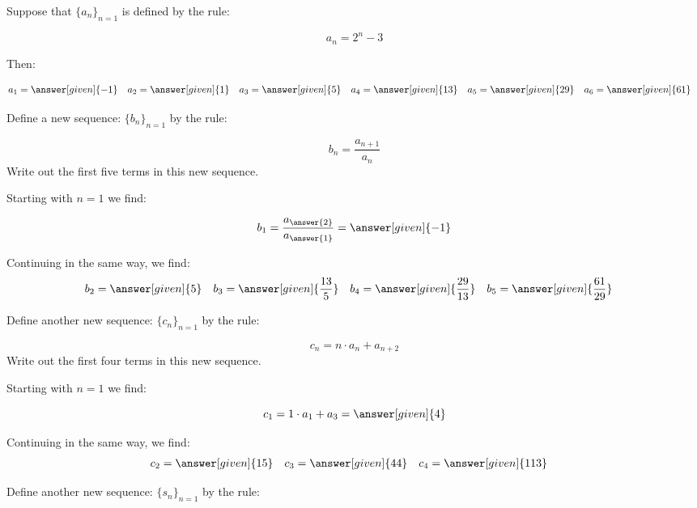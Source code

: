 \documentclass{ximera}
\author{Jim Talamo}
\begin{document}
\begin{exercise}

Suppose that $\{a_n\}_{n=1}$ is defined by the rule:

\[
a_n = 2^n-3
\]

Then:

    \begin{align*}
      a_1 &= \answer[given]{-1} & 
      a_2 &= \answer[given]{1} & 
      a_3 &= \answer[given]{5} & 
      a_4 &= \answer[given]{13} & 
      a_5 &= \answer[given]{29}  & 
      a_6 &= \answer[given]{61} 
    \end{align*}

\begin{exercise}
Define a new sequence: $\{b_n\}_{n=1}$ by the rule:

\[
b_n = \frac{a_{n+1}}{a_n} 
\]
Write out the first five terms in this new sequence.

Starting with $n=1$ we find:

\[      b_1 = \frac{a_{\answer{2}}}{a_{\answer{1}}} = \answer[given]{-1}       \]
      
Continuing in the same way, we find:     
     \begin{align*}
      	b_2 &=  \answer[given]{5}  & 
	b_3 &= \answer[given]{\frac{13}{5}}  & 
	b_4 &= \answer[given]{\frac{29}{13}}  & 
	b_5 &=  \answer[given]{\frac{61}{29}}  & 
    \end{align*}
    

    
\end{exercise}

\begin{exercise}
Define another new sequence: $\{c_n\}_{n=1}$ by the rule:

\[
c_n = n \cdot a_n+a_{n+2} 
\]
Write out the first four terms in this new sequence.


Starting with $n=1$ we find:

\[      c_1 = 1 \cdot a_1 +a_3 = \answer[given]{4}       \]
      
Continuing in the same way, we find:     
     \begin{align*}
      	c_2 &=  \answer[given]{15}  & 
	c_3 &= \answer[given]{44}   & 
	c_4 &= \answer[given]{113}   & 
    \end{align*}
    

\end{exercise}

\begin{exercise}
Define another new sequence: $\{s_n\}_{n=1}$ by the rule:


\end{exercise}
\end{exercise}
\end{document}
